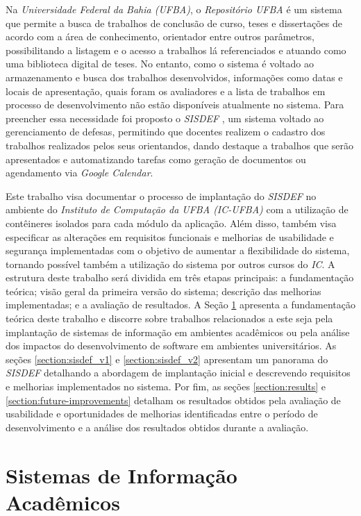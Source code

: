 \documentclass[nonacm, sigconf]{acmart}
\begin{document}
Na \textit{Universidade Federal da Bahia (UFBA)}, o \textit{Repositório UFBA} é um sistema que permite a busca de trabalhos de conclusão de curso, teses e dissertações de acordo com a área de conhecimento, orientador entre outros parâmetros, possibilitando a listagem e o acesso a trabalhos lá referenciados e atuando como uma biblioteca digital de teses. No entanto, como o sistema é voltado ao armazenamento e busca dos trabalhos desenvolvidos, informações como datas e locais de apresentação, quais foram os avaliadores e a lista de trabalhos em processo de desenvolvimento não estão disponíveis atualmente no sistema. Para preencher essa necessidade foi proposto o \textit{SISDEF} \cite{gabrieltcc}, um sistema voltado ao gerenciamento de defesas, permitindo que docentes realizem o cadastro dos trabalhos realizados pelos seus orientandos, dando destaque a trabalhos que serão apresentados e automatizando tarefas como geração de documentos ou agendamento via \textit{Google Calendar}.

Este trabalho visa documentar o processo de implantação do \textit{SISDEF} no ambiente do \textit{Instituto de Computação da UFBA (IC-UFBA)} com a utilização de contêineres isolados para cada módulo da aplicação. Além disso, também visa especificar as alterações em requisitos funcionais e melhorias de usabilidade e segurança implementadas com o objetivo de aumentar a flexibilidade do sistema, tornando possível também a utilização do sistema por outros cursos do \textit{IC}. A estrutura deste trabalho será dividida em três etapas principais: a fundamentação teórica; visão geral da primeira versão do sistema; descrição das melhorias implementadas; e a avaliação de resultados. A Seção \ref{section:academic-information-systems} apresenta a fundamentação teórica deste trabalho e discorre sobre trabalhos relacionados a este seja pela implantação de sistemas de informação em ambientes acadêmicos ou pela análise dos impactos do desenvolvimento de software em ambientes universitários. As seções \ref{section:sisdef_v1} e \ref{section:sisdef_v2} apresentam um panorama do \textit{SISDEF} detalhando a abordagem de implantação inicial e descrevendo requisitos e melhorias implementados no sistema. Por fim, as seções \ref{section:results} e \ref{section:future-improvements} detalham os resultados obtidos pela avaliação de usabilidade e oportunidades de melhorias identificadas entre o período de desenvolvimento e a análise dos resultados obtidos durante a avaliação.
\section{Sistemas de Informação Acadêmicos}
\label{section:academic-information-systems}
\end{document}
